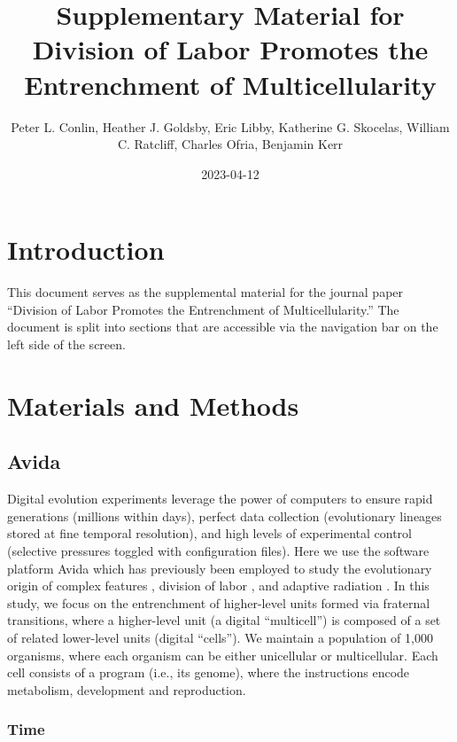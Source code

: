 \documentclass[
]{book}
\title{Supplementary Material for Division of Labor Promotes the Entrenchment of Multicellularity}
\author{Peter L. Conlin, Heather J. Goldsby, Eric Libby, Katherine G. Skocelas, William C. Ratcliff, Charles Ofria, Benjamin Kerr}
\date{2023-04-12}
\begin{document}
\maketitle

{
\setcounter{tocdepth}{1}
\tableofcontents
}
\hypertarget{introduction}{%
\chapter{Introduction}\label{introduction}}

This document serves as the supplemental material for the journal paper ``Division of Labor Promotes the Entrenchment of Multicellularity.'' The document is split into sections that are accessible via the navigation bar on the left side of the screen.

\hypertarget{materials-and-methods}{%
\chapter{Materials and Methods}\label{materials-and-methods}}

\hypertarget{avida}{%
\section{Avida}\label{avida}}

Digital evolution experiments leverage the power of computers to ensure rapid generations (millions within days), perfect data collection (evolutionary lineages stored at fine temporal resolution), and high levels of experimental control (selective pressures toggled with configuration files). Here we use the software platform Avida \citep{ofria2004avida} which has previously been employed to study the evolutionary origin of complex features \citep{Lenski2003}, division of labor \citep{goldsby2012task, goldsby2014evolutionary}, and adaptive radiation \citep{Chow2004}. In this study, we focus on the entrenchment of higher-level units formed via fraternal transitions, where a higher-level unit (a digital ``multicell'') is composed of a set of related lower-level units (digital ``cells''). We maintain a population of 1,000 organisms, where each organism can be either unicellular or multicellular. Each cell consists of a program (i.e., its genome), where the instructions encode metabolism, development and reproduction.

\hypertarget{time}{%
\subsection{Time}\label{time}}
\end{document}
